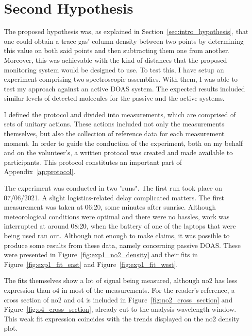 \section{Second Hypothesis}%
\label{sec:second_hypothesis}

The proposed hypothesis was, as explained in
Section~\ref{sec:intro_hypothesis}, that one could obtain a trace gas'
column density between two points by determining this value on both said
points and then subtracting them one from another. Moreover, this was
achievable with the kind of distances that the proposed monitoring
system would be designed to use. To test this, I have setup an
experiment comprising two spectroscopic assemblies. With them, I was
able to test my approach against an active \gls{DOAS} system. The
expected results included similar levels of detected molecules for the
passive and the active systems.

I defined the protocol and divided into measurements, which are
comprised of sets of unitary actions. These actions included not only
the measurements themselves, but also the collection of reference data
for each measurement moment. In order to guide the conduction of the
experiment, both on my behalf and on the volunteer's, a written protocol
was created and made available to participants. This protocol
constitutes an important part of Appendix~\ref{ap:protocol}.

The experiment was conducted in two "runs". The first run took place on
07/06/2021. A slight logistics-related delay complicated matters. The
first measurement was taken at 06:20, some minutes after sunrise.
Although meteorological conditions were optimal and there were no
hassles, work was interrupted at around 08:20, when the battery of one
of the laptops that were being used ran out. Although not enough to make
claims, it was possible to produce some results from these data, namely
concerning passive \gls{DOAS}. These were presented in
Figure~\ref{fig:exp1_no2_density} and their fits in
Figure~\ref{fig:exp1_fit_east} and Figure~\ref{fig:exp1_fit_west}.

The fits themselves show a lot of signal being measured, although
\gls{no2} has less expression than \gls{o4} in most of the
measurements. For the reader's reference, a cross section of \gls{no2}
and \gls{o4} is included in Figure~\ref{fig:no2_cross_section} and
Figure~\ref{fig:o4_cross_section}, already cut to the analysis
wavelength window. This weak fit expression coincides with the trends
displayed on the \gls{no2} density plot. 


